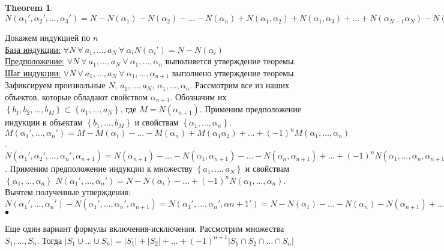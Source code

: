 \documentclass[a4paper]{article}
\theoremstyle{plain}
\newtheorem{theorem}{Theorem}
\theoremstyle{remark}
\theoremstyle{definition}
\renewenvironment{proof}{{\bfseries Proof}}{$\bullet$}
\newcommand{\myset}[1]{\left\{ #1 \right\}}
\newcommand{\walls}[1]{\left | #1 \right |} %
\begin{document}
\begin{theorem}
	$N(\alpha_1', \alpha_2', \ldots, \alpha_3') = N - N(\alpha_1) - N(\alpha_2) - \ldots - N(\alpha_n) + N(\alpha_1, \alpha_2) + N(\alpha_1,\alpha_3) + \ldots + N(\alpha_{N-1}\alpha_N) - N(\alpha_1, \alpha_2,\alpha_3) + \ldots \ldots + (-1)^n N(\alpha_1, \alpha_2, \ldots, \alpha_n)$
\end{theorem}

\begin{proof}
	Докажем индукцией по $n$ \\
	\underline{База индукции:} $\forall N\ \forall\ a_1, \ldots, a_N\ \forall\ \alpha_i N(\alpha_i') = N - N(\alpha_i)$ \\
	\underline{Предположение:} $\forall N\ \forall\ a_1, \ldots, a_N\ \forall\ \alpha_1, \ldots, \alpha_n$ выполняется утверждение теоремы. \\
	\underline{Шаг индукции:} $\forall N\ \forall\ a_1, \ldots, a_N\ \forall\ \alpha_1, \ldots, \alpha_{n+1}$ выполнено утверждение теоремы. \\
	Зафиксируем произвольные $N$, $a_1, \ldots, a_N$, $\alpha_1, \ldots, \alpha_n$. Рассмотрим все из наших объектов, которые обладают свойством $\alpha_{n + 1}$. Обозначим их $\myset{b_1, b_2, \ldots, b_M} \subset \myset{a_1, \ldots, a_N}$, где $M = N(\alpha_{n + 1})$. Применим предположение индукции к объектам $\myset{b_1, \ldots, b_M}$ и свойствам $\myset{\alpha_1, \ldots, \alpha_n}$. $M(\alpha_1', \ldots, \alpha_n') = M - M(\alpha_1) - \ldots - M(\alpha_n) + M(\alpha_1\alpha_2) + \ldots + (-1)^nM(\alpha_1, \ldots, \alpha_n)$. \\
	$N(\alpha_1', \alpha_2', \ldots, \alpha_n', \alpha_{n+1}) = N(\alpha_{n + 1}) - \ldots - N(\alpha_1, \alpha_{n+1}) - \ldots - N(\alpha_n, \alpha_{n + 1}) + \ldots + (-1)^nN(\alpha_1, \ldots, \alpha_n,\alpha_{n+1})$. Применим предположение индукции к множеству $\myset{a_1, \ldots, a_N}$ и свойствам $\myset{\alpha_1, \ldots, \alpha_n}$ $N(\alpha_1',\ldots, \alpha_n') = N - N(\alpha_i) - \ldots + (-1)^nN(\alpha_1, \ldots, \alpha_n)$. \\
	Вычтем полученные утверждения: $N(\alpha_1', \ldots, \alpha_n') - N(\alpha_1', \ldots, \alpha_n', \alpha_{n + 1}) = N(\alpha_1', \ldots, \alpha_n', \alpha{n + 1}') = N - N(\alpha_1) - \ldots - N(\alpha_n) - N(\alpha_{n + 1}) + \ldots + (-1)^{n + 1}N(\alpha_1, \alpha_2, \ldots, \alpha_n, \alpha_{n + 1})$
\end{proof}

Еще один вариант формулы включения-исключения. Рассмотрим множества $S_1, \ldots, S_n$. Тогда $\walls{S_1 \cup \ldots \cup S_n} = |S_1| + |S_2| + \ldots + (-1)^{n + 1} |S_1 \cap S_2 \cap \ldots \cap S_n|$
\end{document}
